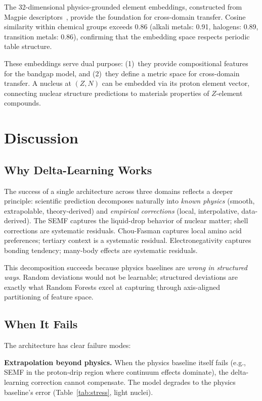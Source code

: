 \documentclass[twocolumn,letterpaper,10pt]{article}
\begin{document}
The 32-dimensional physics-grounded element embeddings, constructed from
Magpie descriptors~\citep{ward2016}, provide the foundation for cross-domain
transfer. Cosine similarity within chemical groups exceeds 0.86 (alkali metals:
0.91, halogens: 0.89, transition metals: 0.86), confirming that the embedding
space respects periodic table structure.

These embeddings serve dual purpose: (1)~they provide compositional features
for the bandgap model, and (2)~they define a metric space for cross-domain
transfer. A nucleus at $(Z,N)$ can be embedded via its proton element vector,
connecting nuclear structure predictions to materials properties of
$Z$-element compounds.

\section{Discussion}
\label{sec:discussion}

\subsection{Why Delta-Learning Works}

The success of a single architecture across three domains reflects a deeper
principle: scientific prediction decomposes naturally into \emph{known physics}
(smooth, extrapolable, theory-derived) and \emph{empirical corrections}
(local, interpolative, data-derived). The SEMF captures the liquid-drop
behavior of nuclear matter; shell corrections are systematic residuals.
Chou-Fasman captures local amino acid preferences; tertiary context is a
systematic residual. Electronegativity captures bonding tendency; many-body
effects are systematic residuals.

This decomposition succeeds because physics baselines are \emph{wrong in
structured ways}. Random deviations would not be learnable; structured
deviations are exactly what Random Forests excel at capturing through
axis-aligned partitioning of feature space.

\subsection{When It Fails}

The architecture has clear failure modes:

\textbf{Extrapolation beyond physics.} When the physics baseline itself fails
(e.g., SEMF in the proton-drip region where continuum effects dominate), the
delta-learning correction cannot compensate. The model degrades to the physics
baseline's error (Table~\ref{tab:stress}, light nuclei).
\end{document}
